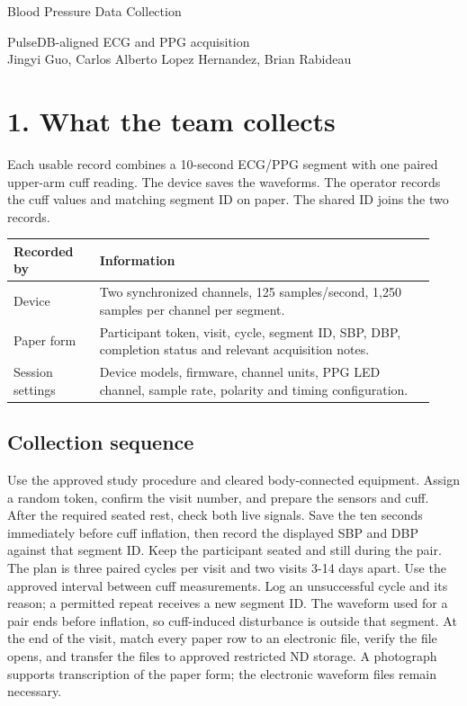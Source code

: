 \documentclass[11pt,letterpaper]{article}
\begin{document}
{\sffamily\color{navy}\LARGE Blood Pressure Data Collection\par}
PulseDB-aligned ECG and PPG acquisition\\
Jingyi Guo, Carlos Alberto Lopez Hernandez, Brian Rabideau
\section*{1. What the team collects}
Each usable record combines a 10-second ECG/PPG segment with one paired upper-arm cuff reading. The device saves the waveforms. The operator records the cuff values and matching segment ID on paper. The shared ID joins the two records.

\par\smallskip
\begin{tabular}{@{}p{0.19\linewidth}p{0.74\linewidth}@{}}\toprule
Recorded by & Information\\\midrule
Device & Two synchronized channels, 125 samples/second, 1,250 samples per channel per segment.\\
Paper form & Participant token, visit, cycle, segment ID, SBP, DBP, completion status and relevant acquisition notes.\\
Session settings & Device models, firmware, channel units, PPG LED channel, sample rate, polarity and timing configuration.\\
\bottomrule\end{tabular}\par\smallskip
\subsection*{Collection sequence}
Use the approved study procedure and cleared body-connected equipment. Assign a random token, confirm the visit number, and prepare the sensors and cuff. After the required seated rest, check both live signals. Save the ten seconds immediately before cuff inflation, then record the displayed SBP and DBP against that segment ID. Keep the participant seated and still during the pair.
The plan is three paired cycles per visit and two visits 3-14 days apart. Use the approved interval between cuff measurements. Log an unsuccessful cycle and its reason; a permitted repeat receives a new segment ID. The waveform used for a pair ends before inflation, so cuff-induced disturbance is outside that segment.
At the end of the visit, match every paper row to an electronic file, verify the file opens, and transfer the files to approved restricted ND storage. A photograph supports transcription of the paper form; the electronic waveform files remain necessary.\newpage
\end{document}
